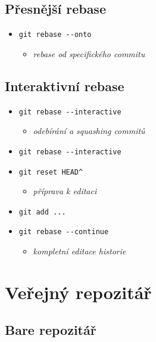\documentclass[10pt,twocolumn]{article}
\begin{document}
\subsection{Přesnější rebase}

\begin{itemize}
	\item \texttt{git rebase {-}{-}onto}
	\begin{itemize} \item \textit{rebase od specifického commitu} \end{itemize}
\end{itemize}

\subsection{Interaktivní rebase}

\begin{itemize}
	\item \texttt{git rebase {-}{-}interactive}
	\begin{itemize} \item \textit{odebírání a squashing commitů} \end{itemize}
	\item \texttt{git rebase {-}{-}interactive}
	\item \texttt{git reset HEAD\^{ }}
	\begin{itemize} \item \textit{příprava k editaci} \end{itemize}
	\item \texttt{git add ...}
	\item \texttt{git rebase {-}{-}continue}
	\begin{itemize} \item \textit{kompletní editace historie} \end{itemize}
\end{itemize}

\section{Veřejný repozitář}
\subsection{Bare repozitář}
\end{document}
